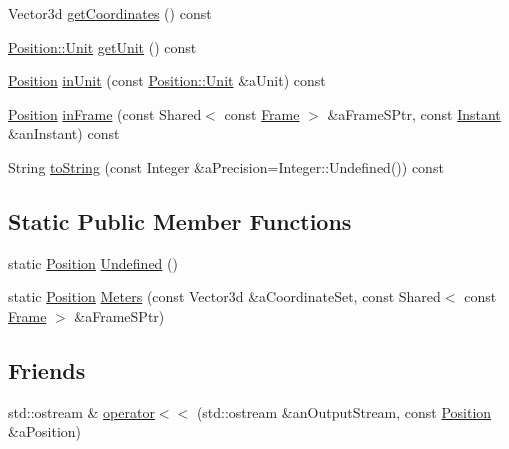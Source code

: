 \begin{DoxyCompactItemize}
\item 
Vector3d \hyperlink{classlibrary_1_1physics_1_1coord_1_1_position_a35981f1150639afac722ccf13bf2f4bd}{get\+Coordinates} () const
\item 
\hyperlink{classlibrary_1_1physics_1_1units_1_1_length_a3b8b39cd245cf6b19dc34459baeccb18}{Position\+::\+Unit} \hyperlink{classlibrary_1_1physics_1_1coord_1_1_position_a1b6173fd9226069e36ac075b444be794}{get\+Unit} () const
\item 
\hyperlink{classlibrary_1_1physics_1_1coord_1_1_position}{Position} \hyperlink{classlibrary_1_1physics_1_1coord_1_1_position_a908878d741ad2de6a2d278d2d674e949}{in\+Unit} (const \hyperlink{classlibrary_1_1physics_1_1units_1_1_length_a3b8b39cd245cf6b19dc34459baeccb18}{Position\+::\+Unit} \&a\+Unit) const
\item 
\hyperlink{classlibrary_1_1physics_1_1coord_1_1_position}{Position} \hyperlink{classlibrary_1_1physics_1_1coord_1_1_position_adc0e64905c2463bcaf9d53a08b3426fb}{in\+Frame} (const Shared$<$ const \hyperlink{classlibrary_1_1physics_1_1coord_1_1_frame}{Frame} $>$ \&a\+Frame\+S\+Ptr, const \hyperlink{classlibrary_1_1physics_1_1time_1_1_instant}{Instant} \&an\+Instant) const
\item 
String \hyperlink{classlibrary_1_1physics_1_1coord_1_1_position_ab88010154fdbcb36b0e25b3986bcc80c}{to\+String} (const Integer \&a\+Precision=Integer\+::\+Undefined()) const
\end{DoxyCompactItemize}
\subsection*{Static Public Member Functions}
\begin{DoxyCompactItemize}
\item 
static \hyperlink{classlibrary_1_1physics_1_1coord_1_1_position}{Position} \hyperlink{classlibrary_1_1physics_1_1coord_1_1_position_a65f80401df5fa5c1eab7e3bdf1b8f8c5}{Undefined} ()
\item 
static \hyperlink{classlibrary_1_1physics_1_1coord_1_1_position}{Position} \hyperlink{classlibrary_1_1physics_1_1coord_1_1_position_a7ef7cc80563339b3f4727f508d19875c}{Meters} (const Vector3d \&a\+Coordinate\+Set, const Shared$<$ const \hyperlink{classlibrary_1_1physics_1_1coord_1_1_frame}{Frame} $>$ \&a\+Frame\+S\+Ptr)
\end{DoxyCompactItemize}
\subsection*{Friends}
\begin{DoxyCompactItemize}
\item 
std\+::ostream \& \hyperlink{classlibrary_1_1physics_1_1coord_1_1_position_aab9f362c268370239ccad2c8a6d0eaee}{operator$<$$<$} (std\+::ostream \&an\+Output\+Stream, const \hyperlink{classlibrary_1_1physics_1_1coord_1_1_position}{Position} \&a\+Position)
\end{DoxyCompactItemize}


